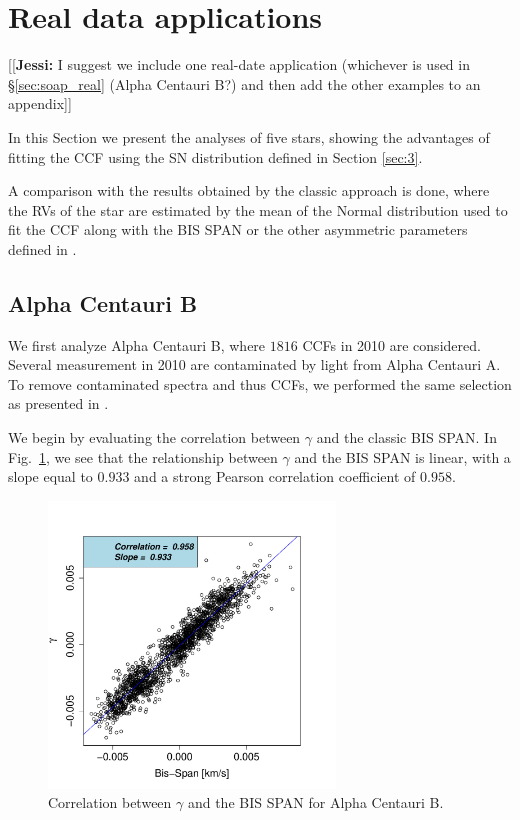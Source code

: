 \documentclass[11pt, oneside]{article}
\newcommand{\jessi}[1]{{\color{Purple}[[\textbf{Jessi: }#1]]}}
\begin{document}
\section{Real data applications} \label{sec:4}
\jessi{I suggest we include one real-date application (whichever is used in \S\ref{sec:soap_real} (Alpha Centauri B?) and then add the other examples to an appendix}

In this Section we present the analyses of five stars, showing the advantages of fitting the CCF using the SN distribution defined in Section \ref{sec:3}. 

A comparison with the results obtained by the classic approach is done, where the RVs of the star are estimated by the mean of the Normal distribution used to fit the CCF along with the BIS SPAN or the other asymmetric parameters defined in \citet{Figueira-2013}.

\subsection{Alpha Centauri B} \label{sec:alphacentb}

We first analyze Alpha Centauri B, where $1816$ CCFs in 2010 are considered. Several measurement in 2010 are contaminated by light from Alpha Centauri A. To remove contaminated spectra and thus CCFs, we performed the same selection as presented in \citet{Dumusque-2012}.

We begin by evaluating the correlation between $\gamma$ and the classic BIS SPAN. In Fig.~\ref{fig:alphacent:corr.gamma}, we see that the relationship between $\gamma$ and the BIS SPAN is linear, with a slope equal to $0.933$ and a strong Pearson correlation coefficient of $0.958$. 
%
\begin{figure}[htbp]
   \centering
\includegraphics[height = 3in]{HD12862_[2]gamma_vs_bisspan.pdf} 
   \caption{Correlation between $\gamma$ and the BIS SPAN for Alpha Centauri B.}
   \label{fig:alphacent:corr.gamma}
\end{figure}
\end{document}
